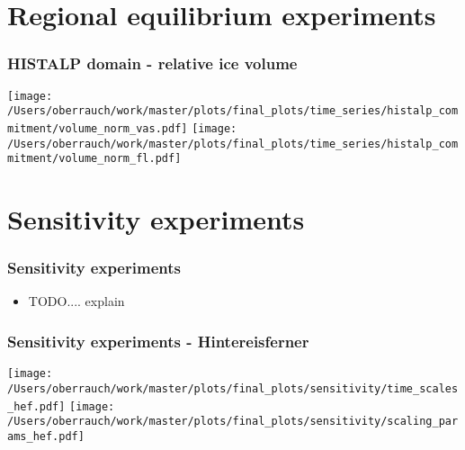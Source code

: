 \documentclass[12pt, aspectratio=169, abstract=off, oneside]{beamer}
\begin{document}
    


\section{Regional equilibrium experiments} %
\label{sec:regional_equilibrium_experiments}

    \begin{frame}[t]\frametitle{HISTALP domain - relative ice volume}
        \centering
        \vfill
        \texttt{[image: /Users/oberrauch/work/master/plots/final\_plots/time\_series/histalp\_commitment/volume\_norm\_vas.pdf]}
        \texttt{[image: /Users/oberrauch/work/master/plots/final\_plots/time\_series/histalp\_commitment/volume\_norm\_fl.pdf]}
    \end{frame}


\section{Sensitivity experiments} %
\label{sec:sensitivity_experiments}

    \begin{frame}[t]\frametitle{Sensitivity experiments}
        \begin{itemize}
            \item TODO.... explain
        \end{itemize}
        

    \end{frame}

    \begin{frame}[t]\frametitle{Sensitivity experiments - Hintereisferner}
        \centering
        \vfill
        \texttt{[image: /Users/oberrauch/work/master/plots/final\_plots/sensitivity/time\_scales\_hef.pdf]}
        \texttt{[image: /Users/oberrauch/work/master/plots/final\_plots/sensitivity/scaling\_params\_hef.pdf]}
    \end{frame}
\end{document}
